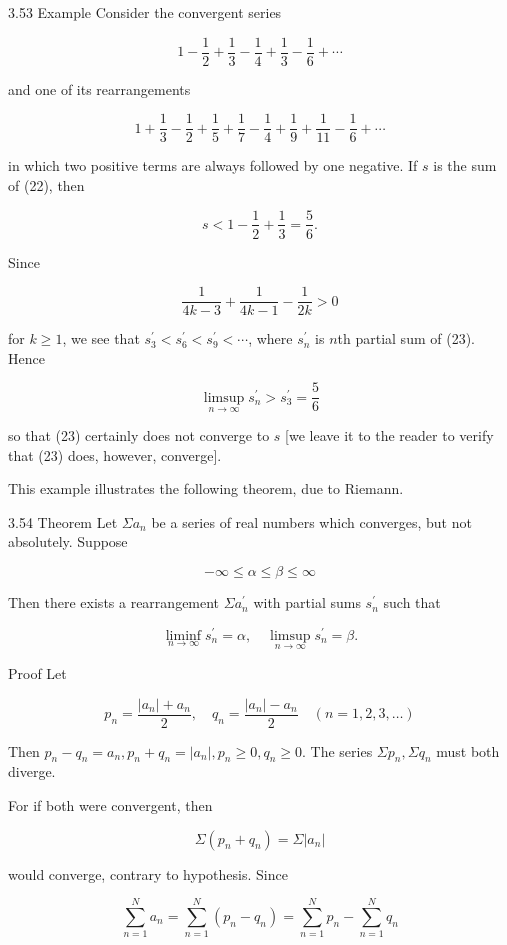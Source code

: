 \documentclass[10pt]{article}
\begin{document}
3.53 Example Consider the convergent series

$$
1-\frac{1}{2}+\frac{1}{3}-\frac{1}{4}+\frac{1}{3}-\frac{1}{6}+\cdots
$$

and one of its rearrangements

$$
1+\frac{1}{3}-\frac{1}{2}+\frac{1}{5}+\frac{1}{7}-\frac{1}{4}+\frac{1}{9}+\frac{1}{11}-\frac{1}{6}+\cdots
$$

in which two positive terms are always followed by one negative. If $s$ is the sum of (22), then

$$
s<1-\frac{1}{2}+\frac{1}{3}=\frac{5}{6} .
$$

Since

$$
\frac{1}{4 k-3}+\frac{1}{4 k-1}-\frac{1}{2 k}>0
$$

for $k \geq 1$, we see that $s_{3}^{\prime}<s_{6}^{\prime}<s_{9}^{\prime}<\cdots$, where $s_{n}^{\prime}$ is $n$th partial sum of (23). Hence

$$
\limsup _{n \rightarrow \infty} s_{n}^{\prime}>s_{3}^{\prime}=\frac{5}{6}
$$

so that (23) certainly does not converge to $s$ [we leave it to the reader to verify that (23) does, however, converge].

This example illustrates the following theorem, due to Riemann.

3.54 Theorem Let $\Sigma a_{n}$ be a series of real numbers which converges, but not absolutely. Suppose

$$
-\infty \leq \alpha \leq \beta \leq \infty
$$

Then there exists a rearrangement $\Sigma a_{n}^{\prime}$ with partial sums $s_{n}^{\prime}$ such that

$$
\liminf _{n \rightarrow \infty} s_{n}^{\prime}=\alpha, \quad \limsup _{n \rightarrow \infty} s_{n}^{\prime}=\beta .
$$

Proof Let

$$
p_{n}=\frac{\left|a_{n}\right|+a_{n}}{2}, \quad q_{n}=\frac{\left|a_{n}\right|-a_{n}}{2} \quad(n=1,2,3, \ldots)
$$

Then $p_{n}-q_{n}=a_{n}, p_{n}+q_{n}=\left|a_{n}\right|, p_{n} \geq 0, q_{n} \geq 0$. The series $\Sigma p_{n}, \Sigma q_{n}$ must both diverge.

For if both were convergent, then

$$
\Sigma\left(p_{n}+q_{n}\right)=\Sigma\left|a_{n}\right|
$$

would converge, contrary to hypothesis. Since

$$
\sum_{n=1}^{N} a_{n}=\sum_{n=1}^{N}\left(p_{n}-q_{n}\right)=\sum_{n=1}^{N} p_{n}-\sum_{n=1}^{N} q_{n}
$$
\end{document}
